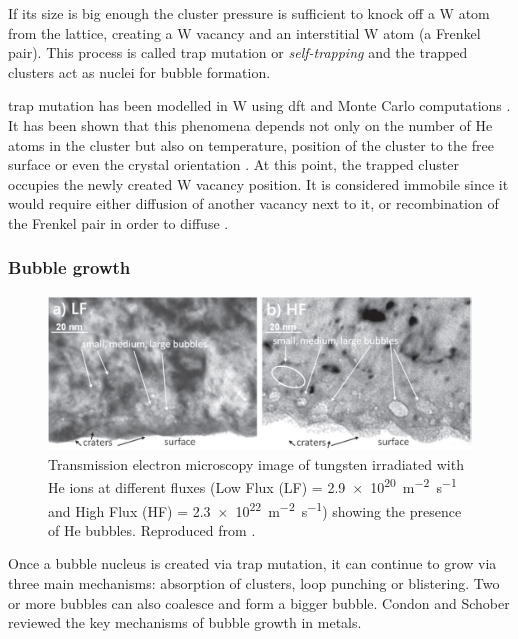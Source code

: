 If its size is big enough the cluster pressure is sufficient to knock off a \gls{W} atom from the \gls{lattice}, creating a \gls{W} \gls{vacancy} and an interstitial \gls{W} atom (a \gls{Frenkel pair}).
This process is called \gls{trap mutation} or \emph{\gls{self-trapping}} and the trapped clusters act as nuclei for bubble formation.

\Gls{trap mutation} has been modelled in \gls{W} using \gls{dft}  and Monte Carlo computations .
It has been shown that this phenomena depends not only on the number of He atoms in the cluster but also on temperature, position of the cluster to the free surface or even the crystal orientation .
At this point, the trapped cluster occupies the newly created \gls{W} \gls{vacancy} position.
It is considered immobile since it would require either diffusion of another \gls{vacancy} next to it, or recombination of the Frenkel pair in order to diffuse .

\subsubsection{Bubble growth}

\begin{figure} [h!]
    \centering
    \includegraphics[width=\linewidth]{Figures/Chapter1/helium_bubbles_ialovega.jpg}
    \caption{Transmission electron microscopy image of tungsten irradiated with He ions at different fluxes (Low Flux (LF) = \SI{2.9e20}{m^{-2}.s^{-1}} and High Flux (HF) = \SI{2.3e22}{m^{-2}.s^{-1}}) showing the presence of He bubbles. Reproduced from \cite{ialovega_hydrogen_2020}.}
\end{figure}

Once a bubble nucleus is created via \gls{trap mutation}, it can continue to grow via three main mechanisms: absorption of clusters, \gls{loop punching} or blistering.
Two or more bubbles can also coalesce and form a bigger bubble.
Condon and Schober  reviewed the key mechanisms of bubble growth in metals.

